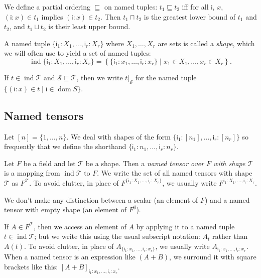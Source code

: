 \documentclass{article}
\newcommand{\name}[1]{\mathsf{#1}}
\newcommand{\tuple}[1]{\{ #1\}}
\DeclareMathOperator{\tupledom}{dom}
\DeclareMathOperator{\tupleshape}{ind}
\newcommand{\tuplerestrict}[2]{\left.#1\right|_{#2}}
\begin{document}
We define a partial ordering $\sqsubseteq$ on named tuples: $t_1 \sqsubseteq t_2$ iff for all $\name{i}$, $x$, $(\name{i}:x) \in t_1$ implies $(\name{i}:x) \in t_2$. Then $t_1 \sqcap t_2$ is the greatest lower bound of $t_1$ and $t_2$, and $t_1 \sqcup t_2$ is their least upper bound.

A named tuple $\tuple{\name{i}_1: X_1, \ldots, \name{i}_r: X_r}$ where $X_1, \ldots, X_r$ are sets is called a \emph{shape}, which we will often use to yield a set of named tuples:
\begin{equation*}
\tupleshape \tuple{\name{i}_1: X_1, \ldots, \name{i}_r: X_r} = \left\{\tuple{\name{i}_1: x_1, \ldots, \name{i}_r: x_r} \mid x_1 \in X_1, \ldots, x_r \in X_r\right\}.
\end{equation*}

If $t \in \tupleshape \mathcal{T}$ and $\mathcal{S} \sqsubseteq \mathcal{T}$, then we write $\tuplerestrict{t}{\mathcal{S}}$ for the named tuple $\{(\name{i}: x) \in t \mid \name{i} \in \tupledom{S}\}$.

\subsection{Named tensors}

Let $[n] = \{1, \ldots, n\}$. We deal with shapes of the form $\tuple{\name{i}_1: [n_1], \ldots, \name{i}_r: [n_r]}$ so frequently that we define the shorthand $\tuple{\name{i}_1: n_1, \ldots, \name{i}_r: n_r}$.

Let $F$ be a field and let $\mathcal{T}$ be a shape. Then a \emph{named tensor over $F$ with shape $\mathcal{T}$} is a mapping from $\tupleshape \mathcal{T}$ to $F$. We write the set of all named tensors with shape $\mathcal{T}$ as $F^{\mathcal{T}}$. To avoid clutter, in place of $F^{\tuple{\name{i}_1: X_1, \ldots, \name{i}_r: X_r}}$, we usually write $F^{\name{i}_1: X_1, \ldots, \name{i}_r: X_r}$.

We don't make any distinction between a scalar (an element of $F$) and a named tensor with empty shape (an element of $F^\emptyset$).

If $A \in F^{\mathcal{T}}$, then we access an element of $A$ by applying it to a named tuple $t \in \tupleshape\mathcal{T}$; but we write this using the usual subscript notation: $A_t$ rather than $A(t)$. To avoid clutter, in place of $A_{\tuple{\name{i}_1: x_1, \ldots, \name{i}_r: x_r}}$, we usually write $A_{\name{i}_1: x_1, \ldots, \name{i}_r: x_r}$. When a named tensor is an expression like $(A+B)$, we surround it with square brackets like this: $[A+B]_{\name{i}_1: x_1, \ldots, \name{i}_r: x_r}$.
\end{document}
